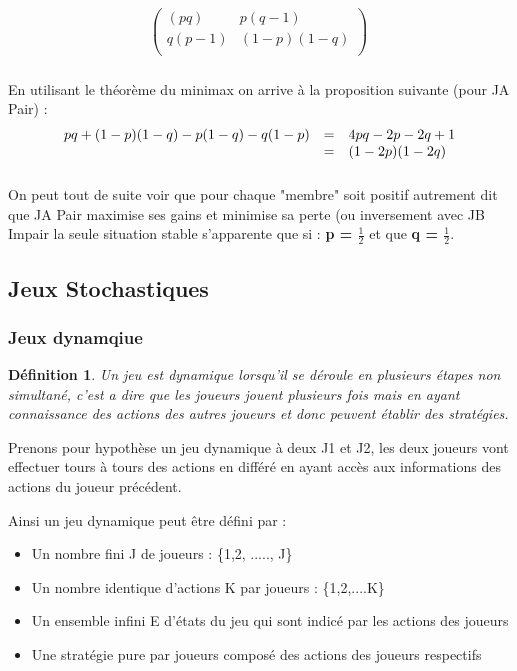\documentclass[a4paper, 12pt, twoside]{article}
\newtheorem{definition}{Définition}
\begin{document}
{{\[
\begin{pmatrix}(pq)& p(q-1)\\
q(p-1)&(1-p)(1-q)\\
\end{pmatrix}\            
\]
\subparagraph*{}{En utilisant le théorème du \textsf{minimax} on arrive à la proposition suivante (pour JA \textsf{Pair}) : }
\begin{align*}
\begin{array}{r c l}
     pq + (1-p)(1-q) -p(1-q) -q(1-p)  & = & 4pq -2p -2q +1  \\
     & = & (1-2p)(1-2q) 
   \end{array}     
\end{align*}

\subparagraph*{}{On peut tout de suite voir que pour chaque "membre" soit positif autrement dit que JA \textsf{Pair} maximise ses gains et minimise sa perte (ou inversement avec JB \textsf{Impair} la seule situation stable s'apparente que si : 
\textbf{p = $\frac{1}{2}$} et que \textbf{q = $\frac{1}{2}$}.}


\subsection{Jeux Stochastiques}
\subsubsection{Jeux dynamqiue}
\begin{definition}
Un jeu est dynamique lorsqu'il se déroule en plusieurs étapes non simultané, c'est a dire que les joueurs jouent plusieurs fois mais en ayant connaissance des actions des autres joueurs et donc peuvent établir des stratégies.
\end{definition}

Prenons pour hypothèse un jeu dynamique à deux  J1 et J2, les deux joueurs vont effectuer tours à tours des actions en différé en ayant accès aux informations des actions du joueur précédent. \newline

Ainsi un \textsf{jeu dynamique} peut être défini par : 
\begin{itemize}
\item Un nombre fini J de joueurs : \{1,2, ....., J\}
\item Un nombre identique d'actions K par joueurs : \{1,2,....K\}  
\item Un ensemble infini E d'états du jeu qui sont indicé par les actions des joueurs 
\item Une stratégie pure par joueurs composé des actions des joueurs respectifs
\end{itemize}

}}
\end{document}
